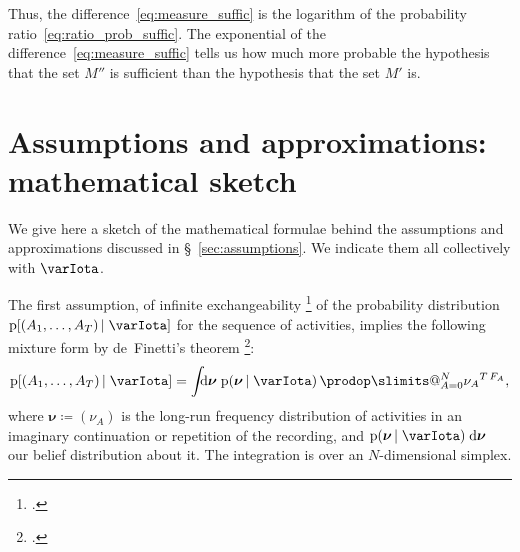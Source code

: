 \documentclass[\ifafour a4paper,12pt,\else a5paper,10pt,\fi%
onecolumn,oneside,article,%
british%
]{memoir}
\makeatletter
\theoremstyle{remark}
\theoremstyle{innote}
\def\prod{\DOTSI\prodop\slimits@}
\newcommand*{\citep}{\footcites}
\newcommand*{\di}{\mathrm{d}}%
\newcommand*{\defd}{\coloneqq}
\newcommand*{\pf}{\mathrm{p}}%
\renewcommand*{\|}{\nonscript\,\vert\nonscript\;\mathopen{}}
\newcommand*{\sect}{\S}%
\newcommand*{\chap}{ch.}%
\newcommand*{\yAv}{A}
\newcommand*{\yFF}{F}
\newcommand*{\yF}{\bm{\yFF}}
\newcommand*{\yA}{\yAv}%
\newcommand*{\yI}{\varIota}
\newcommand*{\ynuu}{\nu}
\newcommand*{\ynu}{\bm{\ynuu}}
\newcommand*{\pxxx}{P}
\newcommand*{\sh}{\mathrm{\varEta}}
\makeatother
\begin{document}
Thus, the difference~\eqref{eq:measure_suffic} is the logarithm of the
probability ratio~\eqref{eq:ratio_prob_suffic}. The exponential of the
difference~\eqref{eq:measure_suffic} tells us how much more probable the
hypothesis that the set $M''$ is sufficient than the hypothesis that the
set $M'$ is.

\section{Assumptions and approximations: mathematical sketch}
\label{sec:inference_prob}

We give here a sketch of the mathematical formulae behind the assumptions
and approximations discussed in \sect~\ref{sec:assumptions}. We indicate
them all collectively with $\yI$.

The first assumption, of infinite exchangeability
\citep[\chap~4]{bernardoetal1994_r2000}{dawid2013%
} of the probability distribution $\pf[(\yA_{1},\dotsc, \yA_{T}) \| \yI]$
for the sequence of activities, implies the following mixture form by
de~Finetti's theorem \citep{definetti1930,hewittetal1955}:
\begin{equation}
  \label{eq:mixture_from_definetti}
  \pf[(\yA_{1},\dotsc, \yA_{T}) \| \yI]
  = \int\!\!\!\di\ynu\;\pf(\ynu \|\yI)\,\prod_{\yA=0}^{N}{\nu_{\yA}}^{T\,\yFF_{\yA}},
\end{equation}
where $\ynu\defd(\nu_{\yA})$ is the long-run frequency distribution of
activities in an imaginary continuation or repetition of the recording, and
$\pf(\ynu \|\yI)\;\di\ynu$ our belief distribution about it. The
integration is over an $N$-dimensional simplex.
\end{document}
